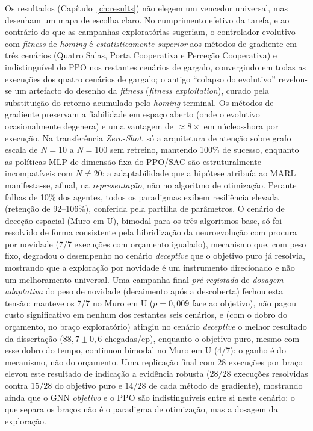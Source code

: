 \documentclass[12pt,reqno, twoside]{amsbook}
\theoremstyle{plain}
\numberwithin{equation}{chapter}
\numberwithin{section}{chapter}
\numberwithin{table}{chapter}
\numberwithin{figure}{chapter}
\begin{document}
Os resultados (Capítulo~\ref{ch:results}) não elegem um vencedor universal, mas desenham um mapa de escolha claro. No cumprimento efetivo da tarefa, e ao contrário do que as campanhas exploratórias sugeriam, o controlador evolutivo com \textit{fitness} de \textit{homing} é \emph{estatisticamente superior} aos métodos de gradiente em três cenários (Quatro Salas, Porta Cooperativa e Perceção Cooperativa) e indistinguível do PPO nos restantes cenários de gargalo, convergindo em todas as execuções dos quatro cenários de gargalo; o antigo ``colapso do evolutivo'' revelou-se um artefacto do desenho da \textit{fitness} (\textit{fitness exploitation}), curado pela substituição do retorno acumulado pelo \textit{homing} terminal. Os métodos de gradiente preservam a fiabilidade em espaço aberto (onde o evolutivo ocasionalmente degenera) e uma vantagem de $\approx 8\times$ em núcleos-hora por execução. Na transferência \textit{Zero-Shot}, só a arquitetura de atenção sobre grafo escala de $N=10$ a $N=100$ sem retreino, mantendo 100\% de sucesso, enquanto as políticas MLP de dimensão fixa do PPO/SAC são estruturalmente incompatíveis com $N\neq 20$: a adaptabilidade que a hipótese atribuía ao MARL manifesta-se, afinal, na \emph{representação}, não no algoritmo de otimização. Perante falhas de 10\% dos agentes, todos os paradigmas exibem resiliência elevada (retenção de 92--106\%), conferida pela partilha de parâmetros. O cenário de deceção espacial (Muro em U), bimodal para os três algoritmos base, só foi resolvido de forma consistente pela hibridização da neuroevolução com procura por novidade (7/7 execuções com orçamento igualado), mecanismo que, com peso fixo, degradou o desempenho no cenário \textit{deceptive} que o objetivo puro já resolvia, mostrando que a exploração por novidade é um instrumento direcionado e não um melhoramento universal. Uma campanha final \emph{pré-registada} de \emph{dosagem adaptativa} do peso de novidade (decaimento após a descoberta) fechou esta tensão: manteve os 7/7 no Muro em U ($p=0{,}009$ face ao objetivo), não pagou custo significativo em nenhum dos restantes seis cenários, e (com o dobro do orçamento, no braço exploratório) atingiu no cenário \textit{deceptive} o melhor resultado da dissertação ($88{,}7 \pm 0{,}6$ chegadas/ep), enquanto o objetivo puro, mesmo com esse dobro do tempo, continuou bimodal no Muro em U (4/7): o ganho é do mecanismo, não do orçamento. Uma replicação final com $28$ execuções por braço elevou este resultado de indicação a evidência robusta ($28/28$ execuções resolvidas contra $15/28$ do objetivo puro e $14/28$ de cada método de gradiente), mostrando ainda que o GNN \emph{objetivo} e o PPO são indistinguíveis entre si neste cenário: o que separa os braços não é o paradigma de otimização, mas a dosagem da exploração.
\end{document}
